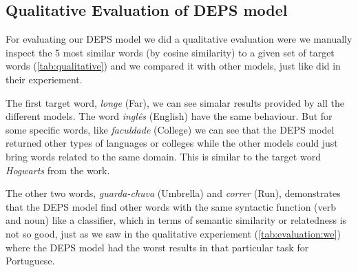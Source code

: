 \subsection{Qualitative Evaluation of DEPS model}\label{chap:results:qualitative}

For evaluating our DEPS model we did a qualitative evaluation were we manually inspect the 5 most similar words (by cosine similarity) to a given set of target words (\autoref{tab:qualitative}) and we compared it with other models, just like  did in their experiement.

The first target word, \textit{longe} (Far), we can see simalar results provided by all the different models. The word \textit{inglês} (English) have the same behaviour. But for some specific words, like \textit{faculdade} (College) we can see that the DEPS model returned other types of languages or colleges while the other models could just bring words related to the same domain. This is similar to the target word \textit{Hogwarts} from the  work.

The other two words, \textit{guarda-chuva} (Umbrella) and \textit{correr} (Run), demonstrates that the DEPS model find other words with the same syntactic function (verb and noun) like a classifier, which in terms of semantic similarity or relatedness is not so good, just as we saw in the qualitative experiement (\autoref{tab:evaluation:we}) where the DEPS model had the worst results in that particular task for Portuguese.






